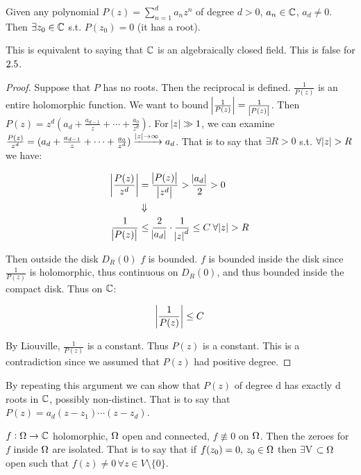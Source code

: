 \begin{corollary}
Given any polynomial $P(z) = \sum_{n=1}^{d} a_n z^n$ of degree $d> 0$, $a_n \in \mathbb{C} $, $a_d \neq 0$. Then $\exists z_0 \in \mathbb{C}$ s.t. $P(z_0) = 0$ (it has a root).
\end{corollary}

\begin{note}
This is equivalent to saying that $\mathbb{C}$ is an algebraically closed field. This is false for $2.5$.
\end{note}


\begin{proof}
Suppose that $P$ has no roots. Then the reciprocal is defined. $\frac{1}{P(z)}$ is an entire holomorphic function. We want to bound $\abs{\frac{1}{P(z)}} = \frac{1}{\abs{P(z)}}$. Then $P(z) = z^d( a_d + \frac{a_{d-1}}{z} + \cdots + \frac{a_0}{z^d})$. For $\abs{z} \gg 1$, we can examine $\frac{P(z)}{z^d} = ( a_d + \frac{a_{d-1}}{z} + \cdots + \frac{a_0}{z^d}) \xrightarrow[]{\abs{z}\to \infty} a_d$. That is to say that $\exists R > 0 $ s.t. $\forall \abs{z} > R$ we have:

\begin{align*}
    \abs{\frac{P(z)}{z^d}} &= \frac{\abs{P(z)}}{\abs{z^d}} > \frac{\abs{a_d}}{2}>0\\
    &\Downarrow\\
    \frac{1}{\abs{P(z)}} &\leq \frac{2}{\abs{a_d}} \cdot \frac{1}{\abs{z}^d} \leq C \: \forall \abs{z} > R
\end{align*}
    
Then outside the disk $D_R(0)$ $f$ is bounded. $f$ is bounded inside the disk since $\frac{1}{P(z)}$ is holomorphic, thus continuous on $D_R(0)$, and thus bounded inside the compact disk. Thus on $\mathbb{C}$:

\begin{align*}
     \abs{\frac{1}{P(z)}} \leq C
\end{align*}

By Liouville, $\frac{1}{P(z)} $ is a constant. Thus $P(z)$ is a constant. This is a contradiction since we assumed that $P(z) $ had positive degree.
\end{proof} 

\begin{note}
By repeating this argument we can show that $P(z)$ of degree d has exactly d roots in $\mathbb{C}$, possibly non-distinct. That is to say that $P(z) = a_d (z-z_1)\cdots (z-z_d)$.
\end{note}


\begin{theorem}

$f:\Omega \rightarrow \mathbb{C}$ holomorphic, $\Omega$ open and connected, $f \not\equiv 0$ on $\Omega$. Then the zeroes for $f$ inside $\Omega$ are isolated. That is to say that if $f(z_0)=0, \, z_0 \in \Omega$ then $\exists $V $\subset \Omega$ open such that $f(z) \neq 0 \, \forall z\in V \setminus \{0\}$.

\end{theorem}

